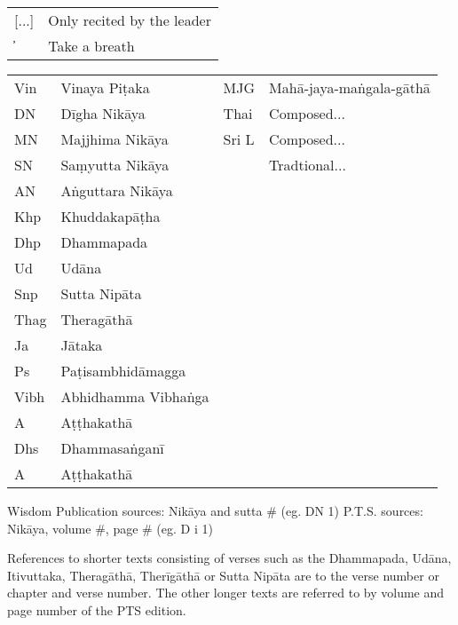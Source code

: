 \clearpage
\thispagestyle{empty}

{}
\bigskip

{\raggedright
\fontsize{10}{14}\selectfont

\begin{tabular}{@{}ll@{}}
[...] & Only recited by the leader \\
̓     & Take a breath               \\
\end{tabular}

\begin{tabular}{@{}llll@{}}
  Vin  & Vinaya Piṭaka       & MJG   & Mahā-jaya-maṅgala-gāthā \\
  DN   & Dīgha Nikāya        & Thai  & Composed...             \\
  MN   & Majjhima Nikāya     & Sri L & Composed...             \\
  SN   & Saṃyutta Nikāya     &       & Tradtional...           \\
  AN   & Aṅguttara Nikāya    &       &                 \\
  Khp  & Khuddakapāṭha       &       &                 \\
  Dhp  & Dhammapada          &       &                 \\
  Ud   & Udāna               &       &                 \\
  Snp  & Sutta Nipāta        &       &                 \\
  Thag & Theragāthā          &       &                 \\
  Ja   & Jātaka              &       &                 \\
  Ps   & Paṭisambhidāmagga   &       &                 \\
  Vibh & Abhidhamma Vibhaṅga &       &                 \\
  A    & Aṭṭhakathā          &       &                 \\
  Dhs  & Dhammasaṅganī       &       &                 \\
  A    & Aṭṭhakathā          &       &                 \\

\end{tabular}

\bigskip

Wisdom Publication sources: Nikāya and sutta # (eg. DN 1)
P.T.S. sources: Nikāya, volume #, page # (eg. D i 1)

References to shorter texts consisting of verses such as the Dhammapada, Udāna,
Itivuttaka, Theragāthā, Therīgāthā or Sutta Nipāta are to the verse number or
chapter and verse number. The other longer texts are referred to by volume and
page number of the PTS edition.

}

